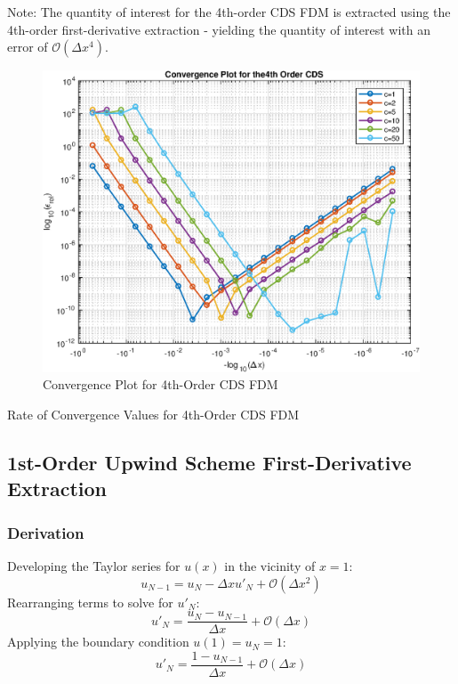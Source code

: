 \documentclass[10pt, reqno]{article}		%
\numberwithin{equation}{section}
\begin{document}
Note: The quantity of interest for the 4th-order CDS FDM is extracted using the 4th-order first-derivative extraction - yielding the quantity of interest with an error of $\mathcal{O}(\Delta x^4)$.

\begin{figure}[H]
	\begin{center}
		\includegraphics[width = 0.57\linewidth]{convergence_4th_order_cds}
		\caption{Convergence Plot for 4th-Order CDS FDM}	
	\end{center}
\end{figure}

\begin{table}[H]
	
	\caption{Rate of Convergence Values for 4th-Order CDS FDM}	
\end{table}

\newpage

\subsection{1st-Order Upwind Scheme First-Derivative Extraction}

\subsubsection{Derivation}

Developing the Taylor series for $u(x)$ in the vicinity of $x = 1$:
\begin{equation}
u_{N-1} = u_N - \Delta x u'_N + \mathcal{O}(\Delta x^2)
\end{equation}
Rearranging terms to solve for $u'_N$:
\begin{equation}
u'_N = \frac{u_N - u_{N-1}}{\Delta x} + \mathcal{O}(\Delta x)
\end{equation}
Applying the boundary condition $u(1) = u_N = 1$:
\begin{equation}
u'_N = \frac{1 - u_{N-1}}{\Delta x} + \mathcal{O}(\Delta x)
\end{equation}
\end{document}
